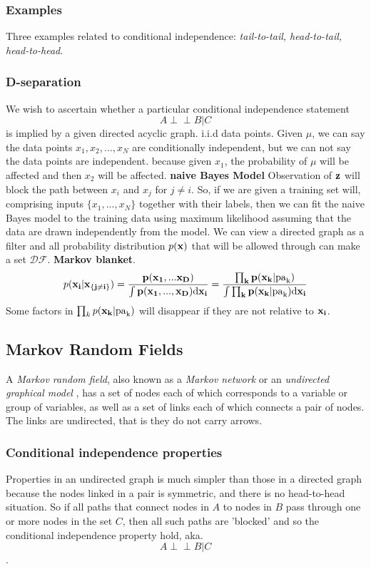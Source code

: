\documentclass[a4paper]{book}
\def\ci{\perp\!\!\!\perp}
\begin{document}
\subsubsection{Examples}
Three examples related to conditional independence: \textit{tail-to-tail, head-to-tail, head-to-head}.
\subsubsection{D-separation}
We wish to ascertain whether a particular conditional
independence statement$$A\ci B |C$$is implied by a given directed acyclic graph.
\newline
i.i.d data points. Given $\mu$, we can say the data points $x_1,x_2,...,x_N$ are conditionally independent, but we can not say the data points are independent. because given $x_1$, the probability of $\mu$ will be affected and then $x_2$ will be affected.
\newline
\textbf{naive Bayes Model} Observation of $\bf{z}$ will block the path between $x_i$ and $x_j$ for $j\neq i$. So, if we are given a training set will, comprising inputs $\{x_1,...,x_N\}$ together with their labels, then we can fit the naive Bayes model to the training data using maximum likelihood assuming that the data are drawn independently from the model.
\newline
We can view a directed graph as a filter and all probability distribution $p(\bf x)$ that will be allowed through can make a set $\mathcal {DF}$.
\newline
\textbf{Markov blanket}.
\begin{equation}\label{eq8.9}
  p(\bf{x}_i|\bf{x}_{\{j\neq i\}}) = \frac{p(\bf x_1,...\bf x_D)}{\int p(\bf x_1,...,\bf x_D)\rm d\bf x_i}=\frac{\prod_k p(\bf x_k|\rm{pa}_k)}{\int \prod_k p(\bf x_k|\rm{pa}_k)\rm{d}\bf x_i}
\end{equation}
Some factors in $\prod_k p(\bf x_k|\rm{pa}_k)$ will disappear if they are not relative to $\bf x_i$.
\subsection{Markov Random Fields}
A \emph{Markov random field}, also known as a \emph{Markov network} or an \emph{undirected graphical model} , has a set of nodes each of which corresponds to a variable or group of variables, as well as a set of links each of which connects a pair of nodes. The links are undirected, that is they do not carry arrows.
\subsubsection{Conditional independence properties}
Properties in an undirected graph is much simpler than those in a directed graph because the nodes linked in a pair is symmetric, and there is no head-to-head situation. So if all paths that connect nodes in $A$ to nodes in $B$ pass through one or more nodes in the set $C$, then all such paths are 'blocked' and so the conditional independence property hold, aka. $$A\ci B|C$$.
\end{document}
